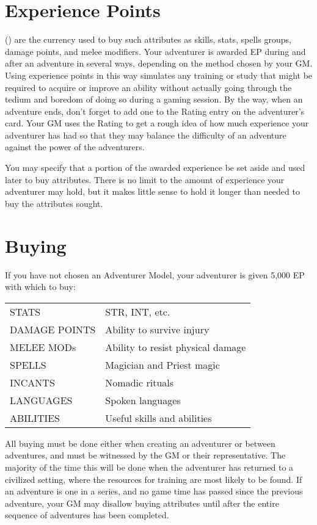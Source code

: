\begin{multicols*}{2}
\section{Experience Points}
 (\EP) are the currency used to buy such attributes as skills, stats, spells groups, damage points, and melee modifiers. Your adventurer is awarded EP during and after an adventure in several ways, depending on the method chosen by your GM. Using experience points in this way simulates any training or study that might be required to acquire or improve an ability without actually going through the tedium and boredom of doing so during a gaming session. By the way, when an adventure ends, don't forget to add one to the Rating entry on the adventurer's card. Your GM uses the Rating to get a rough idea of how much experience your adventurer has had so that they may balance the difficulty of an adventure against the power of the adventurers.

You may specify that a portion of the awarded experience be set aside and used later to buy attributes. There is no limit to the amount of experience your adventurer may hold, but it makes little sense to hold it longer than needed to buy the attributes sought.
\section{Buying}
\label{create-buying}
If you have not chosen an Adventurer Model, your adventurer is given 5,000 EP with which to buy:
\begin{normbox}
\begin{tabular}{@{}l l}
STATS & STR, INT, etc.\\
DAMAGE POINTS  & Ability to survive injury\\
MELEE MODs & Ability to resist physical damage\\
SPELLS & Magician and Priest magic\\
INCANTS & Nomadic rituals\\
LANGUAGES & Spoken languages\\
ABILITIES & Useful skills and abilities\\
\end{tabular}
\end{normbox}
All buying must be done either when creating an adventurer or between adventures, and must be witnessed by the GM or their representative. The majority of the time this will be done when the adventurer has returned to a civilized setting, where the resources for training are most likely to be found. If an adventure is one in a series, and no game time has passed since the previous adventure, your GM may disallow buying attributes until after the entire sequence of adventures has been completed.


\end{multicols*}
